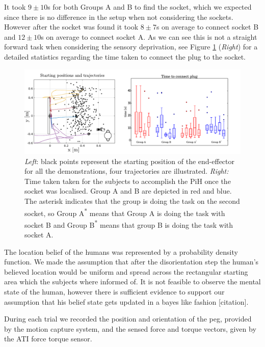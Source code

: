 It took $9\pm10$s for both Groups A and B to find the socket, which we expected since there is 
no difference in the setup when not considering the sockets. However after the socket was found it took $8\pm7$s on average to connect
socket B and $12\pm10$s on average to connect socket A. As we can see this is not a straight forward task when considering
the sensory deprivation, see Figure \ref{fig:experiment_setup_data} (\textit{Right}) for a detailed statistics regarding
the time taken to connect the plug to the socket.

\begin{figure}
 \centering
   \includegraphics[width=\textwidth]{./ch4-PiH/Figures/ex_setup_data.pdf}
   \caption{\textit{Left}: black points represent the starting position of the end-effector
   for all the demonstrations, four trajectories are illustrated. \textit{Right:} 
   Time taken taken for the subjects to accomplish the PiH once the socket was localised. Group A and B are depicted in red 
   and blue. The asterisk indicates that the group is doing the task on the second socket, so Group A\textsuperscript{*} means
   that Group A is doing the task with socket B and Group B\textsuperscript{*} means that group B is doing the task with socket A.}
  \label{fig:experiment_setup_data}
\end{figure}

The location belief of the humans was represented by a probability density function. We made the assumption 
that after the disorientation step the human's believed location would be uniform and spread across the 
rectangular starting area which the subjects where informed of. It is not feasible to observe the 
mental state of the human, however there is sufficient evidence to support our assumption that his belief state
gets updated in a bayes like fashion [citation].

During each trial we recorded the position and orientation of the peg, provided by the motion capture 
system, and the sensed force and torque vectors, given by the ATI force torque sensor. 


